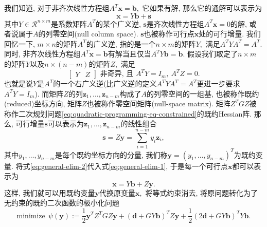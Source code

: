 \documentclass{SBCbookchapter}
\newcommand{\V}[1]{{\bm{#1}}}
\newcommand{\R}{\mathcal{R}}
\numberwithin{equation}{section}
\begin{document}
我们知道, 对于非齐次线性方程组$A^T \V{x} = \V{b},$ 它如果有解, 那么它的通解可以表示为
\begin{equation}
\label{eq:general-elim-1}
\V{x} = Y \V{b} + \V{s}
\end{equation}
其中$Y \in \R^{n\times m}$是系数矩阵$A^T$的某个广义逆, $\V{s}$是齐次线性方程组$A^T \V{x} = 0$的解, 或者说属于$A$的列零空间(null column space). $\V{s}$也被称作可行点$\V{x}$处的可行增量. 我们回忆一下, $m\times n$的矩阵$A^T$的广义逆, 指的是一个$n\times m$的矩阵$Y,$ 满足$A^T Y A^T = A^T.$ 同时, 非齐次线性方程组$A^T \V{x} = \V{b}$有解当且仅当$A^T Y \V{b} = \V{b}.$ 假设我们取定了$n \times m$的矩阵$Y$以及$n \times (n-m)$的矩阵$Z,$ 满足
\begin{equation}
\label{eq:eq:general-elim-req}
\begin{bmatrix} Y & Z\end{bmatrix} \text{ 非奇异, 且~} A^T Y = I_m, ~ A^T Z = 0.
\end{equation}
也就是说$Y$是$A^T$的一个右广义逆(比广义逆的定义$A^T Y A^T = A^T$更进一步要求$A^T Y = I_m$). 而矩阵$Z$的列$\V{z}_1, \ldots, \V{z}_{n-m}$构成了$A$的列零空间的一组基, 也被称作既约(reduced)坐标方向, 矩阵$Z$也被称作零空间矩阵(null-space matrix). 矩阵$Z^T G Z$被称作二次规划问题\eqref{eq:quadratic-programming-eq-constrained}的既约Hessian阵. 那么, 可行增量$\V{s}$可以表示为$\V{z}_1, \ldots, \V{z}_{n-m}$的线性组合
\begin{equation}
\label{eq:general-elim-2}
\V{s} = Z \V{y} = \sum\limits_{i=1}^{n-m} y_i \V{z}_i,
\end{equation}
其中$y_1, \ldots, y_{n-m}$是每个既约坐标方向的分量, 我们称$\V{y} = (y_1, \ldots, y_{n-m})^T$为既约变量. 将式\eqref{eq:general-elim-2}代入式\eqref{eq:general-elim-1}, 于是每一个可行点$\V{x}$都可以表示为
\begin{equation}
\label{eq:general-elim-3}
\V{x} = Y \V{b} + Z \V{y}.
\end{equation}
这样, 我们就可以用既约变量$\V{y}$代换原变量$\V{x},$ 将等式约束消去, 将原问题转化为了无约束的既约二次函数的极小化问题
\begin{equation}
\label{eq:general-elim-4}
\text{minimize} ~~ \psi(\V{y}) := \frac{1}{2} \V{y}^T Z^T G Z \V{y} + \left( \V{d} + G Y \V{b} \right)^T Z \V{y} + \frac{1}{2} \left( 2\V{d} + G Y \V{b} \right)^T Y \V{b}.
\end{equation}
\end{document}
